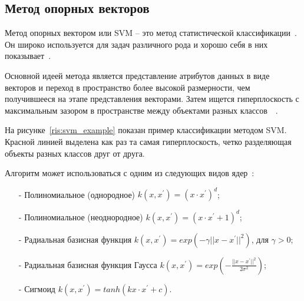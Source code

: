 \subsection{Метод опорных векторов}
Метод опорных вектором или SVM -- это метод статистической классификации~\cite{kristianini}. Он широко используется для задач различного рода и хорошо себя в них показывает~\cite{crammer}.
\par
Основной идеей метода является представление атрибутов данных в виде векторов и переход в пространство более высокой размерности, чем получившееся на этапе представления векторами. Затем ищется гиперплоскость с максимальным зазором в пространстве между объектами разных классов~\cite{rashka}~\cite{statnikov}.
\par
На рисунке~\ref{ris:svm_example} показан пример классификации методом SVM. Красной линией выделена как раз та самая гиперплоскость, четко разделяющая объекты разных классов друг от друга.
\\
\par
Алгоритм может использоваться с одним из следующих видов ядер~\cite{crammer}:
\begin{itemize}
	\item[-] Полиномиальное (однородное) $k(x,x^{'}) = (x \cdot x^{'})^{d}$;
	\item[-] Полиномиальное (неоднородное) $k(x,x^{'}) = (x \cdot x^{'} + 1)^{d}$;
	\item[-] Радиальная базисная функция $k(x,x^{'}) = exp(-\gamma ||x - x^{'}||^{2})$, для $\gamma > 0$;
	\item[-] Радиальная базисная функция Гаусса $k(x,x^{'}) = exp\left ( -\frac{||x - x^{'}||^{2}}{2\sigma^{2}} \right )$;
	\item[-] Сигмоид $k(x,x^{'}) = tanh(kx\cdot x^{'} + c)$.
\end{itemize}
